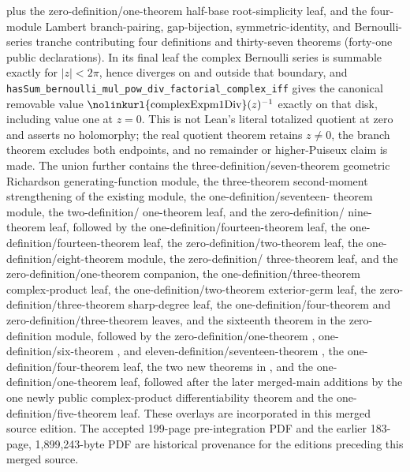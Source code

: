 \documentclass[11pt,oneside]{article}
\theoremstyle{definition}
\theoremstyle{remark}
\newcommand{\lean}[1]{%
  \ifmmode\text{\nolinkurl{#1}}\else\nolinkurl{#1}\fi}
\begin{document}
plus the zero-definition/one-theorem half-base root-simplicity leaf,
and the four-module Lambert branch-pairing, gap-bijection, symmetric-identity,
and Bernoulli-series tranche contributing four definitions and thirty-seven
theorems (forty-one public declarations).  In its final leaf the complex
Bernoulli series is summable exactly for \(\lvert z\rvert<2\pi\), hence
diverges on and outside that boundary, and
\lean{hasSum_bernoulli_mul_pow_div_factorial_complex_iff} gives the canonical
removable value \(\lean{complexExpm1Div}(z)^{-1}\) exactly on that disk,
including value one at \(z=0\).  This is not Lean's literal totalized quotient
at zero and asserts no holomorphy; the real quotient theorem retains
\(z\ne0\), the branch theorem excludes both endpoints, and no remainder or
higher-Puiseux claim is made.  The union further contains the
three-definition/seven-theorem geometric Richardson generating-function
module, the three-theorem second-moment strengthening of the existing
 module, the one-definition/seventeen-
theorem  module, the two-definition/
one-theorem  leaf, and the zero-definition/
nine-theorem  leaf, followed by the
one-definition/fourteen-theorem  leaf, the
one-definition/fourteen-theorem  leaf, the
zero-definition/two-theorem
 leaf, the
one-definition/eight-theorem
 module, the zero-definition/
three-theorem  leaf, and the
zero-definition/one-theorem
 companion, the
one-definition/three-theorem
 complex-product leaf, the
one-definition/two-theorem
 exterior-germ leaf, the
zero-definition/three-theorem
 sharp-degree leaf, the
one-definition/four-theorem  and
zero-definition/three-theorem  leaves,
and the sixteenth theorem in the zero-definition
 module, followed by the
zero-definition/one-theorem ,
one-definition/six-theorem , and
eleven-definition/seventeen-theorem ,
the one-definition/four-theorem
 leaf, the two new theorems in
, and the one-definition/one-theorem
 leaf, followed after the later
merged-main additions by the one newly public complex-product differentiability
theorem and the one-definition/five-theorem
 leaf.
These overlays are incorporated in this merged source edition.  The accepted
199-page pre-integration PDF and the earlier 183-page, 1,899,243-byte PDF are
historical provenance for the editions preceding this merged source.
\end{document}
